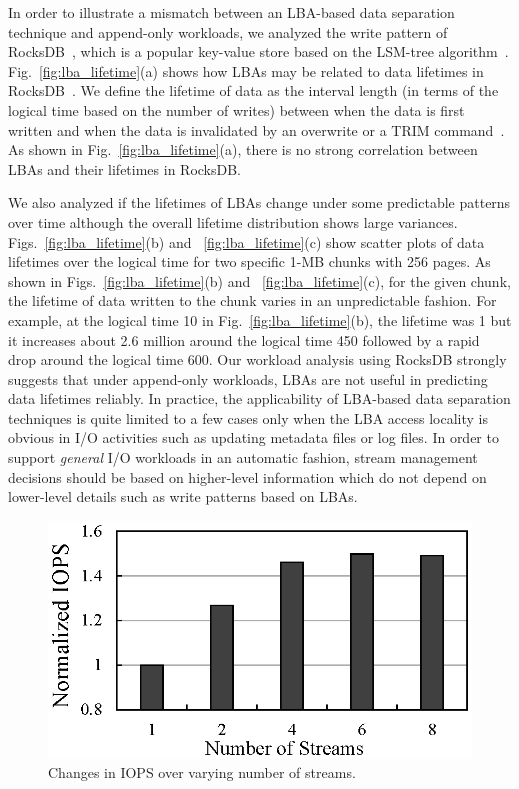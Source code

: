 In order to illustrate a mismatch between an LBA-based data separation technique and 
append-only workloads, we analyzed the write pattern of 
RocksDB~\cite{RocksDB}, which is a
popular key-value store based on the LSM-tree algorithm~\cite{LSM}.
Fig.~\ref{fig:lba_lifetime}(a) shows how LBAs may be related 
to data lifetimes in RocksDB~\cite{RocksDB}.  
We define the lifetime of data as the interval length (in terms of
the logical time based on the number of writes) between
when the data is first written and when the data is invalidated
by an overwrite or a TRIM command~\cite{TRIM}.
As shown in Fig.~\ref{fig:lba_lifetime}(a), 
there is no strong correlation between LBAs and their lifetimes in RocksDB.  

We also analyzed 
if the lifetimes of LBAs change under some predictable patterns over time 
although the overall lifetime distribution shows large variances.
Figs.~\ref{fig:lba_lifetime}(b) and ~\ref{fig:lba_lifetime}(c) show
scatter plots of data lifetimes over the logical time 
for two specific 1-MB chunks with 256 pages. 
As shown in Figs.~\ref{fig:lba_lifetime}(b) and ~\ref{fig:lba_lifetime}(c), 
for the given chunk, the lifetime of data written to the chunk 
varies in an unpredictable fashion.  
For example, at the logical time 10 in Fig.~\ref{fig:lba_lifetime}(b), 
the lifetime was 1 but it increases about 
2.6 million around the logical time 450 
followed by a rapid drop around the logical time 600. 
Our workload analysis using RocksDB strongly suggests that under append-only workloads, 
LBAs are not useful in predicting data lifetimes reliably.
In practice, the applicability of LBA-based data separation techniques is quite 
limited to a few cases only when the LBA access
locality is obvious in I/O activities such as updating metadata files or log files.  
In order to support {\it general} I/O workloads in an automatic fashion, stream 
management decisions should be based on higher-level information
which do not depend on lower-level details such as write patterns based on LBAs.

\begin{figure}[t]
	\centering
	\includegraphics[width=0.7\linewidth]{figure/stream_perf}
	\vspace{-9pt}
	\caption{Changes in IOPS over varying number of streams.} 
	\label{fig:stream_perf}
	\vspace{-15pt}
\end{figure}

